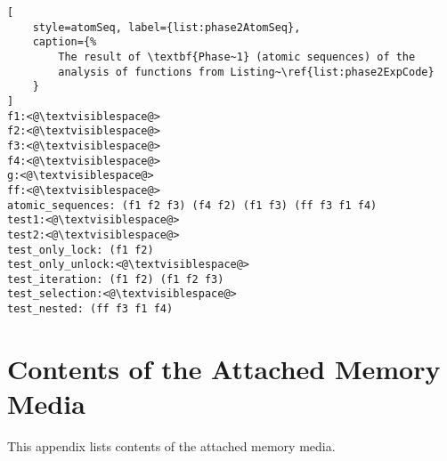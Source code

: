 \begin{lstlisting}[
    style=atomSeq, label={list:phase2AtomSeq},
    caption={%
        The result of \textbf{Phase~1} (atomic sequences) of the
        analysis of functions from Listing~\ref{list:phase2ExpCode}
    }
]
f1:<@\textvisiblespace@>
f2:<@\textvisiblespace@>
f3:<@\textvisiblespace@>
f4:<@\textvisiblespace@>
g:<@\textvisiblespace@>
ff:<@\textvisiblespace@>
atomic_sequences: (f1 f2 f3) (f4 f2) (f1 f3) (ff f3 f1 f4)
test1:<@\textvisiblespace@>
test2:<@\textvisiblespace@>
test_only_lock: (f1 f2)
test_only_unlock:<@\textvisiblespace@>
test_iteration: (f1 f2) (f1 f2 f3)
test_selection:<@\textvisiblespace@>
test_nested: (ff f3 f1 f4)
\end{lstlisting}



\chapter{Contents of the Attached Memory Media}
\label{app:memMedia}

This appendix lists contents of the attached memory media.

